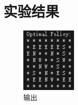 \documentclass{article}
\begin{document}
\section{实验结果}
\begin{figure}[H]
    \centering
    \begin{minipage}{0.35\linewidth}
        \centering
        \includegraphics[width=\linewidth]{./image/image3.png}
        \caption{输出}
    \end{minipage}
    \hspace{0.05\linewidth} %
    \begin{minipage}{0.35\linewidth}
        \centering

\end{minipage}
\end{figure}
\end{document}
